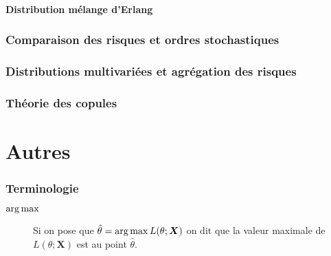 \documentclass[10pt, french]{article}
\begin{document}
\begin{multicols*}{2}
\columnbreak
\subsection{Distribution mélange d'Erlang}



\pagebreak
\section{Comparaison des risques et ordres stochastiques}


\pagebreak
\section{Distributions multivariées et agrégation des risques}


\pagebreak
\section{Théorie des copules}


\newpage
\part{Autres}
\section{Terminologie}
\begin{description}
	\item[$\operatorname*{arg\,max}$]	Si on pose que $\hat{\theta}	=	\operatorname*{arg\,max} L(\theta; \bm{X})$ on dit que la valeur maximale de $L(\theta; \bm{X})$ est au point $\hat{\theta}$.
\end{description}


\end{multicols*}
\end{document}
